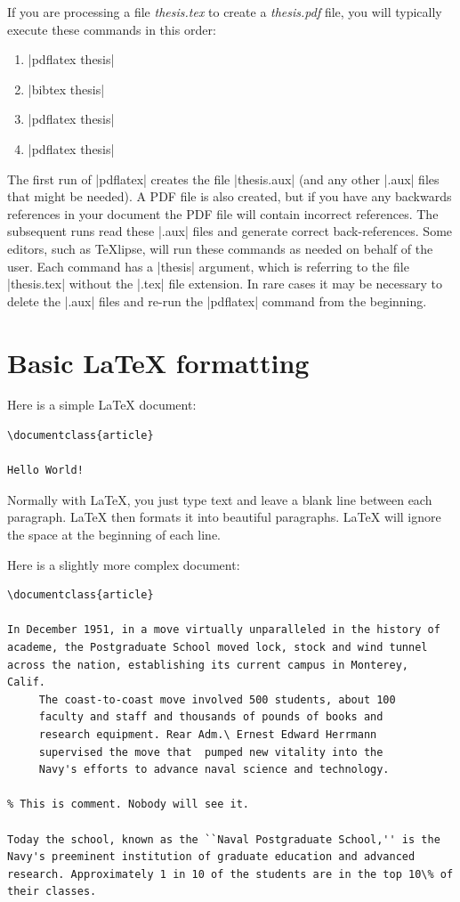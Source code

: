 If you are processing a file \emph{thesis.tex} to create a \emph{thesis.pdf}
file, you will typically execute these commands in this order:

\begin{enumerate}
\item |pdflatex thesis|
\item |bibtex thesis|
\item |pdflatex thesis|
\item |pdflatex thesis|
\end{enumerate}

The first run of |pdflatex| creates the file |thesis.aux| (and any other |.aux|
files that might be needed).  A PDF file is also created, but if you have any
backwards references in your document the PDF file will contain incorrect
references. The subsequent runs read these |.aux| files and generate correct
back-references. Some editors, such as {\TeX}lipse, will run these commands as
needed on behalf of the user.  Each command has a |thesis| argument, which is
referring to the file |thesis.tex| without the |.tex| file extension.  In rare
cases it may be necessary to delete the |.aux| files and re-run the |pdflatex|
command from the beginning.

\section{Basic \LaTeX{} formatting}
Here is a simple \LaTeX{} document:
\begin{Verbatim}
\documentclass{article}

Hello World!

\end{Verbatim}

Normally with \LaTeX{}, you just type text and leave a blank line between each
paragraph. \LaTeX{} then formats it into beautiful paragraphs. \LaTeX{} will
ignore the space at the beginning of each line.

Here is a slightly more complex document:

\begin{Verbatim}
\documentclass{article}

In December 1951, in a move virtually unparalleled in the history of
academe, the Postgraduate School moved lock, stock and wind tunnel
across the nation, establishing its current campus in Monterey,
Calif. 
     The coast-to-coast move involved 500 students, about 100
     faculty and staff and thousands of pounds of books and 
     research equipment. Rear Adm.\ Ernest Edward Herrmann 
     supervised the move that  pumped new vitality into the
     Navy's efforts to advance naval science and technology.

% This is comment. Nobody will see it.

Today the school, known as the ``Naval Postgraduate School,'' is the
Navy's preeminent institution of graduate education and advanced
research. Approximately 1 in 10 of the students are in the top 10\% of
their classes.

\end{Verbatim}

